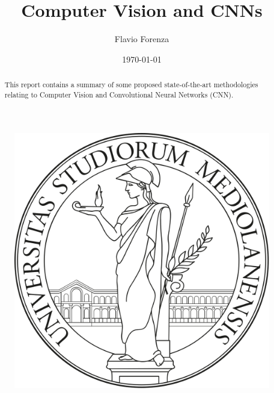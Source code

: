 \documentclass[letterpaper,12pt]{article}
\begin{document}
    
\title{\bfseries{Computer Vision and CNNs}}
\author{Flavio Forenza}
\date\today
\maketitle

\begin{figure}[h!]
  \centering
  \includegraphics[width=0.2\linewidth]{images/logoUnimi2.png}
  \centering
\end{figure}

\begin{abstract}
    This report contains a summary of some proposed state-of-the-art 
    methodologies relating to Computer Vision and Convolutional Neural 
    Networks (CNN).
\end{abstract}



\newpage


\newpage


\newpage


\newpage


\newpage


\newpage


\newpage


\newpage


\newpage


\newpage


\newpage


\end{document}
